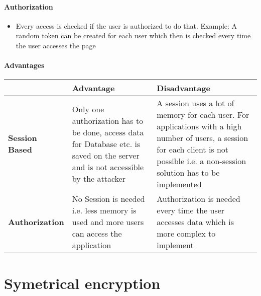 \documentclass[11pt,twoside,a4paper]{article}
\begin{document}
        \paragraph{Authorization}
        \begin{itemize}
        	\item Every access is checked if the user is authorized to do that. Example: A random token can be created for each user which then is checked every time the user accesses the page
        \end{itemize}

		\paragraph{Advantages}
		
		\begin{tabular}{|l|p{4cm}|p{4cm}|}
			\hline
			& \textbf{Advantage} & \textbf{Disadvantage} \\\hline
			\textbf{Session Based} & Only one authorization has to be done, access data for Database etc. is saved on the server and is not accessible by the attacker & A session uses a lot of memory for each user. For applications with a high number of users, a session for each client is not possible i.e. a non-session solution has to be implemented \\\hline
			\textbf{Authorization} & No Session is needed i.e. less memory is used and more users can access the application & Authorization is needed every time the user accesses data which is more complex to implement\\\hline
		\end{tabular}
		
		\section{Symetrical encryption}
\end{document}

